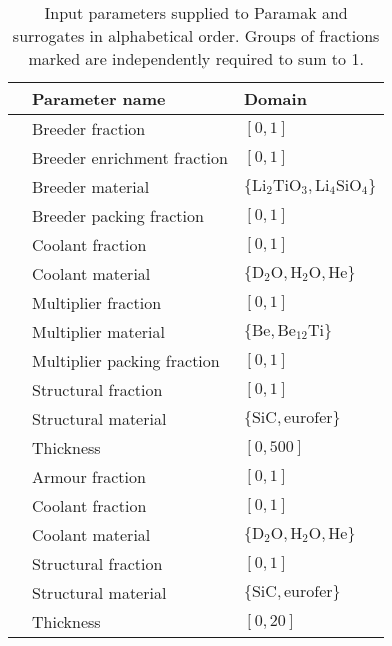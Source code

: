 \begin{table}[t]
	\setlength\tabcolsep{2pt}
	\renewcommand{\arraystretch}{0.95}
	\caption{\label{tbl:params}Input parameters supplied to Paramak and surrogates in alphabetical order. Groups of fractions marked\textsuperscript{\textdagger
		\textdaggerdbl} are independently required to sum to 1.}
	\begin{indented}
	\item[]
		\begin{tabular}{l|ll}
		\toprule
		{} & Parameter name & Domain\\
		\midrule
		\parbox[t]{2mm}{\hspace{-2pt}}
		   & Breeder fraction\textsuperscript{\textdagger} & $[0,1]$\\
		   & Breeder  enrichment fraction & $[0,1]$\\
		   & Breeder material & $\{\text{Li}_2\text{TiO}_3, \text{Li}_4\text{SiO}_4\}$\\
		   & Breeder packing fraction & $[0,1]$\\
		   & Coolant fraction\textsuperscript{\textdagger} & $[0,1]$\\
		   & Coolant material & $\{\text{D}_2\text{O}, \text{H}_2\text{O}, \text{He}\}$\\
		   & Multiplier fraction\textsuperscript{\textdagger} & $[0,1]$\\
		   & Multiplier material & $\{\text{Be}, \text{Be}_{12}\text{Ti}\}$\\
		   & Multiplier packing fraction & $[0,1]$\\
		   & Structural fraction\textsuperscript{\textdagger} & $[0,1]$\\
		   & Structural material & $\{\text{SiC}, \text{eurofer}\}$\\
		   & Thickness & $[0,500]$\\
		\midrule
		\parbox[t]{2mm}{\hspace{-2pt}}
		   & Armour fraction\textsuperscript{\textdaggerdbl} & $[0,1]$\\
		   & Coolant fraction\textsuperscript{\textdaggerdbl} & $[0,1]$\\
		   & Coolant material & $\{\text{D}_2\text{O}, \text{H}_2\text{O}, \text{He}\}$\\
		   & Structural fraction\textsuperscript{\textdaggerdbl} & $[0,1]$\\
		   & Structural material & $\{\text{SiC}, \text{eurofer}\}$\\
		   & Thickness & $[0,20]$\\
		\bottomrule
		\end{tabular}
	\end{indented}
\end{table}

